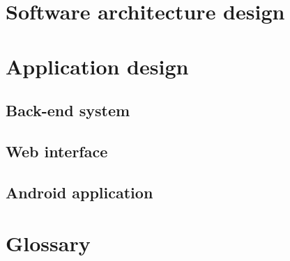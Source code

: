 \documentclass[12pt]{article}
\begin{document}
	\newpage
	\section{Software architecture design}
	
		\vspace{0.2in}
		
		
		
	\section{Application design}
	
		\vspace{0.2in}
		
		
		
	\subsection{Back-end system}

		\vspace{0.2in}
		
		
		
		
	\subsection{Web interface}

	\vspace{0.2in}
	
	
	\newpage
	\subsection{Android application}
			
	\vspace{0.2in}
	
	
	
	
	\vspace{0.2in}

	
	\newpage	
	\section{Glossary}
	
\end{document}
